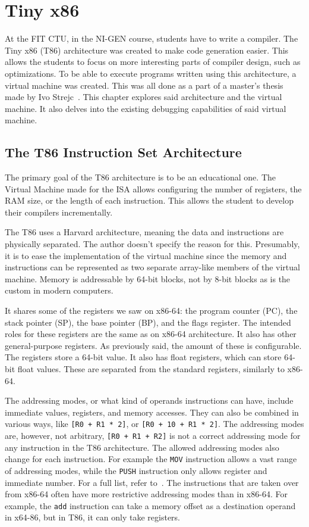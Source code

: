 \chapter{Tiny x86}\label{section:T86}
At the FIT CTU, in the NI-GEN course, students have to write a compiler. The
Tiny x86 (T86) architecture was created to make code generation easier. This
allows the students to focus on more interesting parts of compiler design, such
as optimizations. To be able to execute programs written using this
architecture, a virtual machine was created. This was all done as a part of a
master's thesis made by Ivo Strejc~\cite{ivo2021tiny}. This chapter explores
said architecture and the virtual machine. It also delves into the existing
debugging capabilities of said virtual machine.

\section{The T86 Instruction Set Architecture}
The primary goal of the T86 architecture is to be an educational one. The
Virtual Machine made for the ISA allows configuring the number of registers,
the RAM size, or the length of each instruction. This allows the student to
develop their compilers incrementally.

The T86 uses a Harvard architecture, meaning the data and instructions are
physically separated. The author doesn't specify the reason for this.
Presumably, it is to ease the implementation of the virtual machine since the
memory and instructions can be represented as two separate array-like members
of the virtual machine. Memory is addressable by 64-bit blocks, not by 8-bit
blocks as is the custom in modern computers.

It shares some of the registers we saw on x86-64: the program counter (PC), the
stack pointer (SP), the base pointer (BP), and the flags register. The intended
roles for these registers are the same as on x86-64 architecture. It also has
other general-purpose registers. As previously said, the amount of these is
configurable. The registers store a 64-bit value. It also has float registers,
which can store 64-bit float values. These are separated from the standard
registers, similarly to x86-64.

The addressing modes, or what kind of operands instructions can have, include
immediate values, registers, and memory accesses. They can also be combined in
various ways, like \texttt{[R0 + R1 * 2]}, or \texttt{[R0 + 10 + R1 * 2]}. The
addressing modes are, however, not arbitrary, \texttt{[R0 + R1 + R2]} is not a
correct addressing mode for any instruction in the T86 architecture. The
allowed addressing modes also change for each instruction. For example the
\texttt{MOV} instruction allows a vast range of addressing modes, while the
\texttt{PUSH} instruction only allows register and immediate number. For a full
list, refer to~\cite{ivo2021tiny}. The instructions that are taken over from
x86-64 often have more restrictive addressing modes than in x86-64. For
example, the \verb|add| instruction can take a memory offset as a destination
operand in x64-86, but in T86, it can only take registers.


